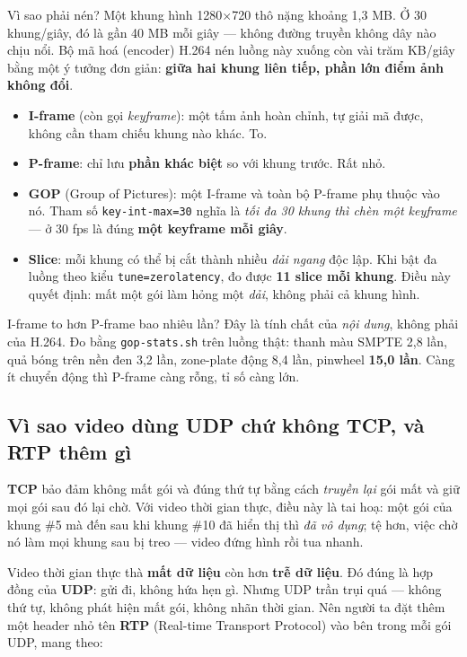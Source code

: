 \documentclass[12pt]{ai_conquer2026}
\begin{document}
Vì sao phải nén? Một khung hình 1280$\times$720 thô nặng khoảng 1,3 MB. Ở 30
khung/giây, đó là gần 40 MB mỗi giây --- không đường truyền không dây nào chịu
nổi. Bộ mã hoá (encoder) H.264 nén luồng này xuống còn vài trăm KB/giây bằng một
ý tưởng đơn giản: \textbf{giữa hai khung liên tiếp, phần lớn điểm ảnh không đổi}.

\begin{itemize}
\item \textbf{I-frame} (còn gọi \emph{keyframe}): một tấm ảnh hoàn chỉnh, tự giải
      mã được, không cần tham chiếu khung nào khác. To.
\item \textbf{P-frame}: chỉ lưu \textbf{phần khác biệt} so với khung trước. Rất
      nhỏ.
\item \textbf{GOP} (Group of Pictures): một I-frame và toàn bộ P-frame phụ thuộc
      vào nó. Tham số \texttt{key-int-max=30} nghĩa là \emph{tối đa 30 khung thì
      chèn một keyframe} --- ở 30 fps là đúng \textbf{một keyframe mỗi giây}.
\item \textbf{Slice}: mỗi khung có thể bị cắt thành nhiều \emph{dải ngang} độc
      lập. Khi bật đa luồng theo kiểu \texttt{tune=zerolatency}, đo được
      \textbf{11 slice mỗi khung}. Điều này quyết định: mất một gói làm hỏng một
      \emph{dải}, không phải cả khung hình.
\end{itemize}

I-frame to hơn P-frame bao nhiêu lần? Đây là tính chất của \emph{nội dung}, không
phải của H.264. Đo bằng \texttt{gop-stats.sh} trên luồng thật: thanh màu SMPTE
2,8 lần, quả bóng trên nền đen 3,2 lần, zone-plate động 8,4 lần, pinwheel
\textbf{15,0 lần}. Càng ít chuyển động thì P-frame càng rỗng, tỉ số càng lớn.

\subsection{Vì sao video dùng UDP chứ không TCP, và RTP thêm gì}

\textbf{TCP} bảo đảm không mất gói và đúng thứ tự bằng cách \emph{truyền lại} gói
mất và giữ mọi gói sau đó lại chờ. Với video thời gian thực, điều này là tai hoạ:
một gói của khung \#5 mà đến sau khi khung \#10 đã hiển thị thì \emph{đã vô
dụng}; tệ hơn, việc chờ nó làm mọi khung sau bị treo --- video đứng hình rồi tua
nhanh.

Video thời gian thực thà \textbf{mất dữ liệu} còn hơn \textbf{trễ dữ liệu}. Đó
đúng là hợp đồng của \textbf{UDP}: gửi đi, không hứa hẹn gì. Nhưng UDP trần trụi
quá --- không thứ tự, không phát hiện mất gói, không nhãn thời gian. Nên người ta
đặt thêm một header nhỏ tên \textbf{RTP} (Real-time Transport Protocol) vào bên
trong mỗi gói UDP, mang theo:
\end{document}
